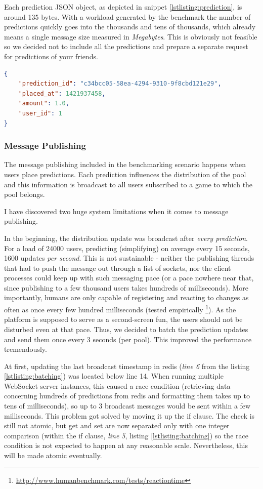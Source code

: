 \documentclass{uvamscse}
\begin{document}
Each prediction JSON object, as depicted in snippet \ref{lstlisting:prediction}, is around 135 bytes. With a workload generated by the benchmark the number of predictions quickly goes into the thousands and tens of thousands, which already means a single message size measured in \textit{Megabytes}. This is obviously not feasible so we decided not to include all the predictions and prepare a separate request for predictions of your friends.

\begin{sourcecode}[H]
\begin{lstlisting}[language=json]
{
    "prediction_id": "c34bcc05-58ea-4294-9310-9f8cbd121e29",
    "placed_at": 1421937458,
    "amount": 1.0,
    "user_id": 1
}
\end{lstlisting}
\caption{Single prediction JSON object.}
\label{lstlisting:prediction}
\end{sourcecode}

\subsubsection{Message Publishing}
The message publishing included in the benchmarking scenario happens when users place predictions. Each prediction influences the distribution of the pool and this information is broadcast to all users subscribed to a game to which the pool belongs.

I have discovered two huge system limitations when it comes to message publishing.

In the beginning, the distribution update was broadcast after \textit{every prediction}. For a load of 24000 users, predicting (simplifying) on average every 15 seconds, 1600 updates \textit{per second}. This is not sustainable - neither the publishing threads that had to push the message out through a list of sockets, nor the client processes could keep up with such messaging pace (or a pace nowhere near that, since publishing to a few thousand users takes hundreds of milliseconds). More importantly, humans are only capable of registering and reacting to changes as often as once every few hundred milliseconds (tested empirically \footnote{\url{http://www.humanbenchmark.com/tests/reactiontime}}). As the platform is supposed to serve as a second-screen fun, the users should not be disturbed even at that pace. Thus, we decided to batch the prediction updates and send them once every 3 seconds (per pool). This improved the performance tremendously.

At first, updating the last broadcast timestamp in redis (\textit{line 6} from the listing \ref{lstlisting:batching}) was located below line 14. When running multiple WebSocket server instances, this caused a race condition (retrieving data concerning hundreds of predictions from redis and formatting them takes up to tens of milliseconds), so up to 3 broadcast messages would be sent within a few milliseconds. This problem got solved by moving it up the if clause. The check is still not atomic, but get and set are now separated only with one integer comparison (within the if clause, \textit{line 5}, listing \ref{lstlisting:batching}) so the race condition is not expected to happen at any reasonable scale. Nevertheless, this will be made atomic eventually.
\end{document}
